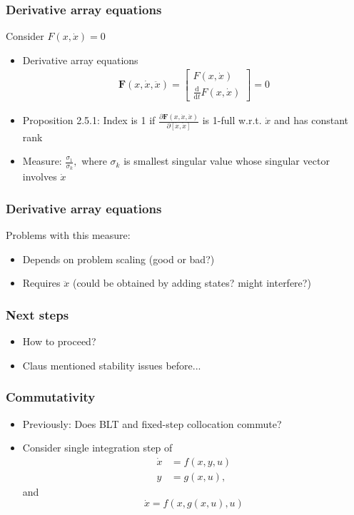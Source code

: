 \documentclass[]{beamer}
\begin{document}
\begin{frame}
\frametitle{Derivative array equations}
Consider $F(x, \dot x) = 0$
\begin{itemize}
\item
Derivative array equations
\begin{align}
\bm F(x, \dot x, \ddot x) = \begin{bmatrix}
F(x, \dot x)\\
\frac{\mathrm{d}}{\mathrm{d}t} F(x, \dot x)
\end{bmatrix} = 0
\end{align}
\item
Proposition 2.5.1: Index is 1 if
$\displaystyle\frac{\partial \bm F(x, \dot x, \ddot x)}{\partial [\dot x, \ddot x]}$ is 1-full w.r.t. $\dot x$ and has constant rank
\item
Measure: $\displaystyle \frac{\sigma_1}{\sigma_k},$ where $\sigma_k$ is smallest singular value whose singular vector involves $\dot x$
\end{itemize}
\end{frame}

\begin{frame}
\frametitle{Derivative array equations}
Problems with this measure:
\begin{itemize}
\item
Depends on problem scaling (good or bad?)
\item
Requires $\ddot x$ (could be obtained by adding states? might interfere?)
\end{itemize}
\end{frame}

\begin{frame}
\frametitle{Next steps}
\begin{itemize}
\item
How to proceed?
\item
Claus mentioned stability issues before...
\end{itemize}
\end{frame}

\begin{frame}
\frametitle{Commutativity}
\begin{itemize}
\item
Previously: Does BLT and fixed-step collocation commute?
\item
Consider single integration step of
\begin{equation}
\begin{aligned}
\dot x &= f(x, y, u) \\
y &= g(x, u),
\end{aligned}
\end{equation}
and
\begin{equation}
\dot x = f(x, g(x, u), u)
\end{equation}
\end{itemize}
\end{frame}
\end{document}
